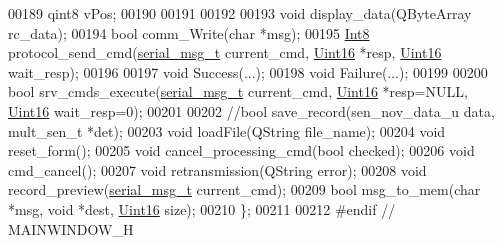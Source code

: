 \begin{DoxyCode}
00189     qint8 vPos;
00190 
00191 
00192 
00193     \textcolor{keywordtype}{void} display\_data(QByteArray rc\_data);
00194     \textcolor{keywordtype}{bool} comm\_Write(\textcolor{keywordtype}{char} *msg);
00195     \hyperlink{a00004_aafb609548b1aa0152c46f9205b79d0f0}{Int8} protocol\_send\_cmd(\hyperlink{a00004_d3/dd5/a00215}{serial\_msg\_t} current\_cmd, \hyperlink{a00004_aae7407b021d43f7193a81a58cfb3e297}{Uint16} *resp, 
      \hyperlink{a00004_aae7407b021d43f7193a81a58cfb3e297}{Uint16} wait\_resp);
00196 
00197     \textcolor{keywordtype}{void} Success(...);
00198     \textcolor{keywordtype}{void} Failure(...);
00199 
00200     \textcolor{keywordtype}{bool} srv\_cmds\_execute(\hyperlink{a00004_d3/dd5/a00215}{serial\_msg\_t} current\_cmd, \hyperlink{a00004_aae7407b021d43f7193a81a58cfb3e297}{Uint16} *resp=NULL, 
      \hyperlink{a00004_aae7407b021d43f7193a81a58cfb3e297}{Uint16} wait\_resp=0);
00201 
00202     \textcolor{comment}{//bool save\_record(sen\_nov\_data\_u data, mult\_sen\_t *det);}
00203     \textcolor{keywordtype}{void} loadFile(QString file\_name);
00204     \textcolor{keywordtype}{void} reset\_form();
00205     \textcolor{keywordtype}{void} cancel\_processing\_cmd(\textcolor{keywordtype}{bool} checked);
00206     \textcolor{keywordtype}{void} cmd\_cancel();
00207     \textcolor{keywordtype}{void} retransmission(QString error);
00208     \textcolor{keywordtype}{void} record\_preview(\hyperlink{a00004_d3/dd5/a00215}{serial\_msg\_t} current\_cmd);
00209     \textcolor{keywordtype}{bool} msg\_to\_mem(\textcolor{keywordtype}{char} *msg, \textcolor{keywordtype}{void} *dest, \hyperlink{a00004_aae7407b021d43f7193a81a58cfb3e297}{Uint16} size);
00210 \};
00211 
00212 \textcolor{preprocessor}{#endif // MAINWINDOW\_H}
\end{DoxyCode}
